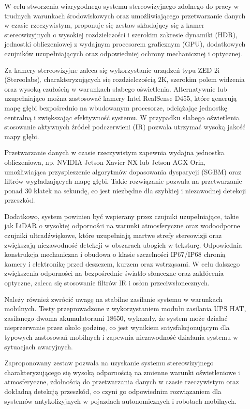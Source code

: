 \documentclass[magisterska]{pracadypl}
\begin{document}
W celu stworzenia wiarygodnego systemu stereowizyjnego zdolnego do pracy w trudnych warunkach środowiskowych oraz umożliwiającego przetwarzanie danych w czasie rzeczywistym, proponuje się zestaw składający się z kamer stereowizyjnych o wysokiej rozdzielczości i szerokim zakresie dynamiki (HDR), jednostki obliczeniowej z wydajnym procesorem graficznym (GPU), dodatkowych czujników uzupełniających oraz odpowiedniej ochrony mechanicznej i optycznej.  

Za kamery stereowizyjne zaleca się wykorzystanie urządzeń typu ZED 2i (Stereolabs), charakteryzujących się rozdzielczością 2K, szerokim polem widzenia oraz wysoką czułością w warunkach słabego oświetlenia. Alternatywnie lub uzupełniająco można zastosować kamery Intel RealSense D455, które generują mapę głębi bezpośrednio na wbudowanym procesorze, odciążając jednostkę centralną i zwiększając efektywność systemu. W przypadku słabego oświetlenia stosowanie aktywnych źródeł podczerwieni (IR) pozwala utrzymać wysoką jakość mapy głębi.

Przetwarzanie danych w czasie rzeczywistym zapewnia wydajna jednostka obliczeniowa, np. NVIDIA Jetson Xavier NX lub Jetson AGX Orin, umożliwiająca przyspieszenie algorytmów dopasowania dysparycji (SGBM) oraz filtrów wygładzających mapę głębi. Takie rozwiązanie pozwala na przetwarzanie ponad 30 klatek na sekundę, co jest niezbędne dla szybkiej i niezawodnej detekcji przeszkód.

Dodatkowo, system powinien być wspierany przez czujniki uzupełniające, takie jak LiDAR o wysokiej odporności na warunki atmosferyczne oraz wodoodporne czujniki ultradźwiękowe, które uzupełniają martwe strefy stereowizji oraz zwiększają niezawodność detekcji w obszarach ubogich w teksturę. Odpowiednia konstrukcja mechaniczna i obudowa o klasie szczelności IP67/IP68 chronią kamery i elektronikę przed deszczem, kurzem oraz wstrząsami. W celu dalszego zwiększenia odporności na bezpośrednie światło słoneczne oraz zakłócenia optyczne, zaleca się stosowanie filtrów IR i osłon przeciwsłonecznych.

Należy również zwrócić uwagę na stabilne zasilanie systemu w warunkach mobilnych. Testy przeprowadzone z wykorzystaniem modułu zasilania UPS HAT, zasilanego dwoma akumulatorami 18650, wykazały, że system może działać nieprzerwanie przez około godzinę, co jest wynikiem satysfakcjonującym dla typowych zastosowań mobilnych i zapewnia niezawodność działania systemu w sytuacjach awaryjnych.

Zaproponowany zestaw pozwala na uzyskanie systemu stereowizyjnego charakteryzującego się wysoką odpornością na zmienne warunki oświetleniowe i atmosferyczne, zdolnością do przetwarzania danych w czasie rzeczywistym oraz dokładną detekcją przeszkód, co czyni go odpowiednim rozwiązaniem dla systemów antykolizyjnych w pojazdach autonomicznych i robotach mobilnych.
\end{document}
